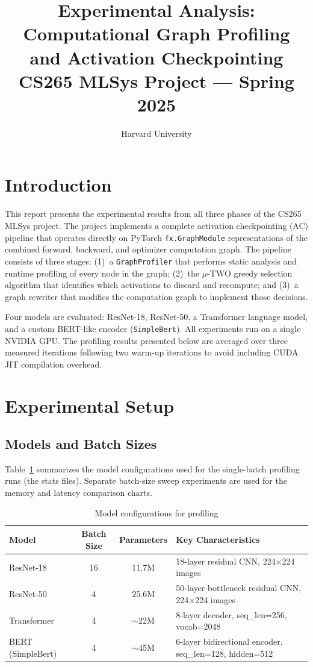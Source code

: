 \documentclass[11pt]{article}
\title{\textbf{Experimental Analysis: Computational Graph Profiling\\
and Activation Checkpointing}\\
\large CS265 MLSys Project --- Spring 2025}
\author{Harvard University}
\date{}
\begin{document}
\maketitle

\section{Introduction}

This report presents the experimental results from all three phases of the
CS265 MLSys project. The project implements a complete activation
checkpointing (AC) pipeline that operates directly on PyTorch
\texttt{fx.GraphModule} representations of the combined forward, backward,
and optimizer computation graph. The pipeline consists of three stages:
(1)~a \texttt{GraphProfiler} that performs static analysis and runtime
profiling of every node in the graph; (2)~the $\mu$-TWO greedy selection
algorithm that identifies which activations to discard and recompute; and
(3)~a graph rewriter that modifies the computation graph to implement
those decisions.

Four models are evaluated: ResNet-18, ResNet-50, a Transformer language
model, and a custom BERT-like encoder (\texttt{SimpleBert}). All
experiments run on a single NVIDIA GPU. The profiling results presented
below are averaged over three measured iterations following two warm-up
iterations to avoid including CUDA JIT compilation overhead.

\section{Experimental Setup}

\subsection{Models and Batch Sizes}

Table~\ref{tab:setup} summarizes the model configurations used for the
single-batch profiling runs (the stats files). Separate batch-size sweep
experiments are used for the memory and latency comparison charts.

\begin{table}[H]
\centering
\caption{Model configurations for profiling}
\label{tab:setup}
\begin{tabular}{lccl}
\toprule
\textbf{Model} & \textbf{Batch Size} & \textbf{Parameters} & \textbf{Key Characteristics} \\
\midrule
ResNet-18   & 16 & 11.7M  & 18-layer residual CNN, 224$\times$224 images \\
ResNet-50   & 4  & 25.6M  & 50-layer bottleneck residual CNN, 224$\times$224 images \\
Transformer & 4  & $\sim$22M & 8-layer decoder, seq\_len=256, vocab=2048 \\
BERT (SimpleBert) & 4 & $\sim$45M & 6-layer bidirectional encoder, seq\_len=128, hidden=512 \\
\bottomrule
\end{tabular}
\end{table}
\end{document}
